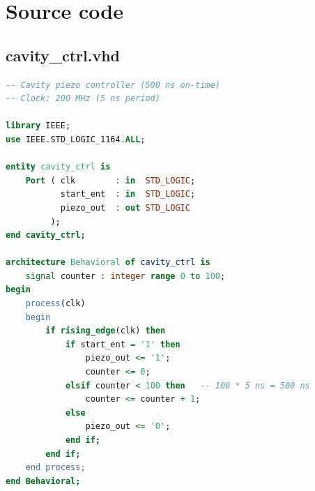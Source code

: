 \documentclass[12pt,a4paper]{article}
\begin{document}
\section{Source code}

\subsection*{cavity\_ctrl.vhd}
\begin{lstlisting}[language=VHDL]
-- Cavity piezo controller (500 ns on-time)
-- Clock: 200 MHz (5 ns period)

library IEEE;
use IEEE.STD_LOGIC_1164.ALL;

entity cavity_ctrl is
    Port ( clk        : in  STD_LOGIC;
           start_ent  : in  STD_LOGIC;
           piezo_out  : out STD_LOGIC
         );
end cavity_ctrl;

architecture Behavioral of cavity_ctrl is
    signal counter : integer range 0 to 100;
begin
    process(clk)
    begin
        if rising_edge(clk) then
            if start_ent = '1' then
                piezo_out <= '1';
                counter <= 0;
            elsif counter < 100 then   -- 100 * 5 ns = 500 ns
                counter <= counter + 1;
            else
                piezo_out <= '0';
            end if;
        end if;
    end process;
end Behavioral;
\end{lstlisting}
\end{document}
